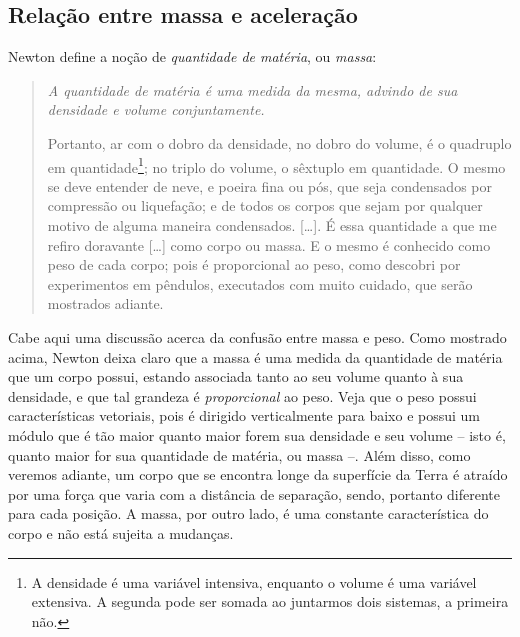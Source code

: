 \subsection{Relação entre massa e aceleração}

Newton define a noção de \emph{quantidade de matéria}, ou \emph{massa}:
\begin{quote}
\emph{A quantidade de matéria é uma medida da mesma, advindo de sua densidade e volume conjuntamente.}
  
Portanto, ar com o dobro da densidade, no dobro do volume, é o quadruplo em quantidade\footnote{A densidade é uma variável intensiva, enquanto o volume é uma variável extensiva. A segunda pode ser somada ao juntarmos dois sistemas, a primeira não.}; no triplo do volume, o sêxtuplo em quantidade. O mesmo se deve entender de neve, e poeira fina ou pós, que seja condensados por compressão ou liquefação; e de todos os corpos que sejam por qualquer motivo de alguma maneira condensados. [\dots]. É essa quantidade a que me refiro doravante [\dots] como corpo ou massa. E o mesmo é conhecido como peso de cada corpo; pois é proporcional ao peso, como descobri por experimentos em pêndulos, executados com muito cuidado, que serão mostrados adiante.
\end{quote}
%
Cabe aqui uma discussão acerca da confusão entre massa e peso. Como mostrado acima, Newton deixa claro que a massa é uma medida da quantidade de matéria que um corpo possui, estando associada tanto ao seu volume quanto à sua densidade, e que tal grandeza é \emph{proporcional} ao peso. Veja que o peso possui características vetoriais, pois é dirigido verticalmente para baixo e possui um módulo que é tão maior quanto maior forem sua densidade e seu volume -- isto é, quanto maior for sua quantidade de matéria, ou massa --. Além disso, como veremos adiante, um corpo que se encontra longe da superfície da Terra é atraído por uma força que varia com a distância de separação, sendo, portanto diferente para cada posição. A massa, por outro lado, é uma constante característica do corpo e não está sujeita a mudanças.

